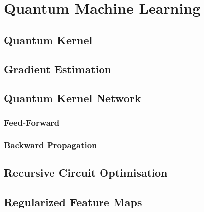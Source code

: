 \chapter{Quantum Machine Learning}\label{chap:QML}


\section{Quantum Kernel}\label{sec:Quantum Kernel}


\section{Gradient Estimation}\label{sec:Gradient Estimation}


\section{Quantum Kernel Network}\label{sec:Quantum Kernel Network}


\subsection{Feed-Forward}\label{sec:FeedForward}


\subsection{Backward Propagation}\label{sec:BackwardPropagation}


\section{Recursive Circuit Optimisation}\label{sec:RCO}

\section{Regularized Feature Maps}\label{sec:RFM}


